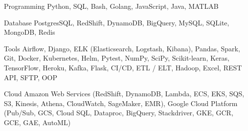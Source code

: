 

\begin{cvskills}

  \cvskill
    {Programming} %
    {Python, SQL, Bash, Golang, JavaScript, Java, MATLAB} %

  \cvskill
    {Database} %
    {PostgresSQL, RedShift, DynamoDB, BigQuery, MySQL, SQLite, MongoDB, Redis} %

  \cvskill
    {Tools} %
    {Airflow, Django, ELK (Elasticsearch, Logstash, Kibana), Pandas, Spark, Git, Docker, Kubernetes, Helm, Pytest, NumPy, SciPy, Scikit-learn, Keras, TensorFlow, Heroku, Kafka, Flask, CI/CD, ETL / ELT, Hadoop, Excel, REST API, SFTP, OOP} %






  \cvskill
    {Cloud} %
    {Amazon Web Services (RedShift, DynamoDB, Lambda, ECS, EKS, SQS, S3, Kinesis, Athena, CloudWatch, SageMaker, EMR),
    Google Cloud Platform (Pub/Sub, GCS, Cloud SQL, Dataproc, BigQuery, Stackdriver, GKE, GCR, GCE, GAE, AutoML)} 


\end{cvskills}
